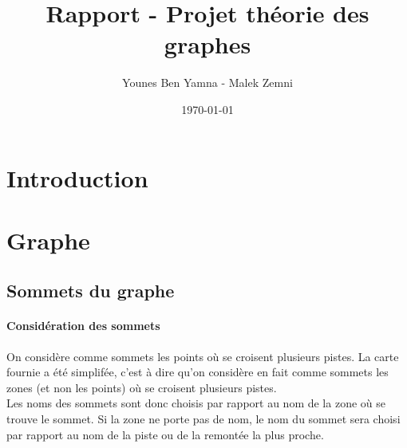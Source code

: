 \documentclass[a4]{article}
\author{Younes Ben Yamna - Malek Zemni}
\title{Rapport - Projet théorie des graphes}
\date{\today}
\begin{document}
\maketitle

	\section{Introduction}
	\section{Graphe}
		\subsection{Sommets du graphe}
			\paragraph{Considération des sommets\\}
			On considère comme sommets les points où se croisent plusieurs pistes. La carte fournie a été simplifée, c'est à dire qu'on
			considère en fait comme sommets les zones (et non les points) où se croisent plusieurs pistes.\\
			Les noms des sommets sont donc choisis par rapport au nom de la zone où se trouve le sommet. 
			Si la zone ne porte pas de nom, le nom du sommet sera choisi par rapport au nom de la piste ou de la remontée la plus proche.
\end{document}
